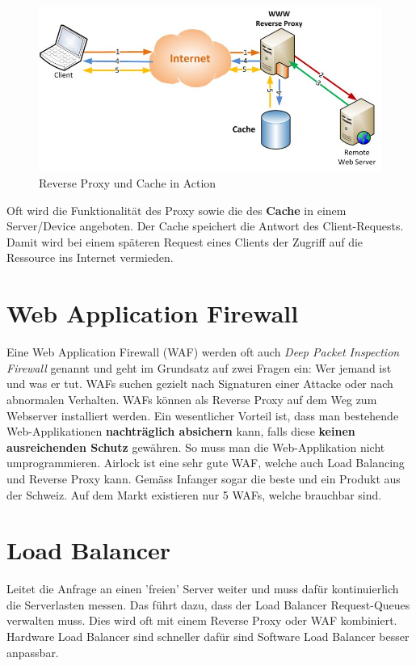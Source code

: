 \begin{figure}[h!]
	\centering
	\includegraphics[width=0.7\linewidth]{fig/cms-reverse-proxy-cache}
	\caption{Reverse Proxy und Cache in Action}
	\label{fig:cms-reverse-proxy-cache}
\end{figure}

Oft wird die Funktionalität des Proxy sowie die des \textbf{Cache} in einem Server/Device angeboten. Der Cache speichert die Antwort des Client-Requests. Damit wird bei einem späteren Request eines Clients der Zugriff auf die Ressource ins Internet vermieden.

\section{Web Application Firewall}
Eine Web Application Firewall (WAF) werden oft auch \emph{Deep Packet Inspection Firewall} genannt und geht im Grundsatz auf zwei Fragen ein: Wer jemand ist und was er tut. WAFs suchen gezielt nach Signaturen einer Attacke oder nach abnormalen Verhalten. WAFs können als Reverse Proxy auf dem Weg zum Webserver installiert werden. Ein wesentlicher Vorteil ist, dass man bestehende Web-Applikationen \textbf{nachträglich absichern} kann, falls diese \textbf{keinen ausreichenden Schutz} gewähren. So muss man die Web-Applikation nicht umprogrammieren. Airlock ist eine sehr gute WAF, welche auch Load Balancing und Reverse Proxy kann. Gemäss Infanger sogar die beste und ein Produkt aus der Schweiz. Auf dem Markt existieren nur 5 WAFs, welche brauchbar sind.

\section{Load Balancer}
Leitet die Anfrage an einen 'freien' Server weiter und muss dafür kontinuierlich die Serverlasten messen. Das führt dazu, dass der Load Balancer Request-Queues verwalten muss. Dies wird oft mit einem Reverse Proxy oder WAF kombiniert. Hardware Load Balancer sind schneller dafür sind Software Load Balancer besser anpassbar. 

